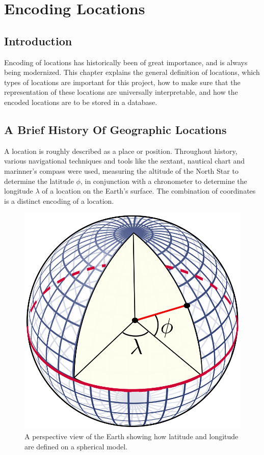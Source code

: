 \graphicspath{{Chapter2/Figs/Vector/}{Chapter2/Figs/}}

%
\chapter{Encoding Locations}
\section{Introduction}
Encoding of locations has historically been of great importance, and is always being modernized. This chapter explains the general definition of locations, which types of locations are important for this project, how to make sure that the representation of these locations are universally interpretable, and how the encoded locations are to be stored in a database.

%
\section{A Brief History Of Geographic Locations}
A location is roughly described as a place or position. Throughout history, various navigational techniques and tools like the sextant, nautical chart and marinner's compass were used, measuring the altitude of the North Star to determine the latitude $\phi$, in conjunction with a chronometer to determine the longitude $\lambda$ of a location on the Earth's surface. The combination of coordinates is a distinct encoding of a location.

\begin{figure}[htbp!]
	\centering
	\includegraphics[width=.2\textwidth]{LatLngSphere}
	\caption[LatLngSphere]{A perspective view of the Earth showing how latitude and longitude are defined on a spherical model.}
	\label{fig:latlngsphere}
\end{figure}

